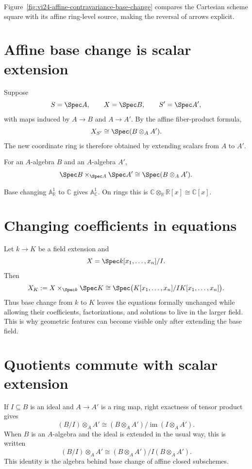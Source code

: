 

Figure~\ref{fig:vi24-affine-contravariance-base-change} compares the Cartesian
scheme square with its affine ring-level source, making the reversal of arrows explicit.


\section{Affine base change is scalar extension}
Suppose
\[
S=\Spec A,\qquad X=\Spec B,\qquad S'=\Spec A',
\]
with maps induced by $A\to B$ and $A\to A'$.  By the affine fiber-product formula,
\[
X_{S'}\cong\Spec(B\otimes_A A').
\]
The new coordinate ring is therefore obtained by extending scalars from $A$ to $A'$.

\begin{theorem}\label{thm:vi24-affine}
For an $A$-algebra $B$ and an $A$-algebra $A'$,
\[
\Spec B\times_{\Spec A}\Spec A'\cong\Spec(B\otimes_A A').
\]
\end{theorem}



\begin{example}\label{ex:vi24-expand-01}
Base changing $\mathbb A^1_{\mathbb R}$ to $\mathbb C$ gives $\mathbb A^1_{\mathbb C}$.  On rings this is $\mathbb C\otimes_{\mathbb R}\mathbb R[x]\cong\mathbb C[x]$.
\end{example}
\section{Changing coefficients in equations}
Let $k\to K$ be a field extension and
\[
X=\Spec k[x_1,\dots,x_n]/I.
\]
Then
\[
X_K:=X\times_{\Spec k}\Spec K
\cong
\Spec\bigl(K[x_1,\dots,x_n]/IK[x_1,\dots,x_n]\bigr).
\]
Thus base change from $k$ to $K$ leaves the equations formally unchanged while allowing their
coefficients, factorizations, and solutions to live in the larger field.  This is why geometric
features can become visible only after extending the base field.



\section{Quotients commute with scalar extension}
If $I\subseteq B$ is an ideal and $A\to A'$ is a ring map, right exactness of tensor product gives
\[
(B/I)\otimes_A A'\cong
(B\otimes_A A')/\operatorname{im}(I\otimes_A A').
\]
When $B$ is an $A$-algebra and the ideal is extended in the usual way, this is written
\[
(B/I)\otimes_AA'\cong(B\otimes_AA')/I(B\otimes_AA').
\]
This identity is the algebra behind base change of affine closed subschemes.

